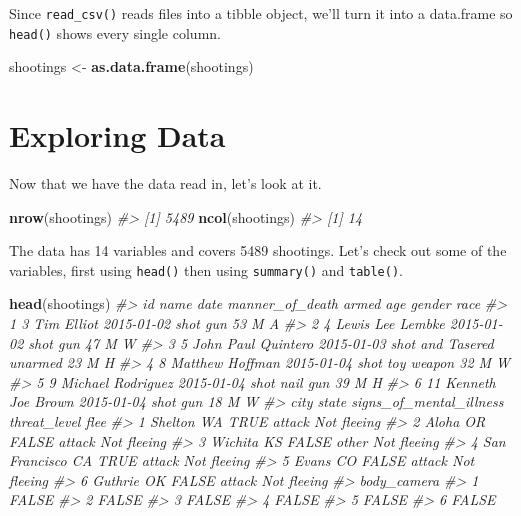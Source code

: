 \documentclass[
  12pt,
]{book}
\newenvironment{Shaded}{\begin{snugshade}}{\end{snugshade}}
\newcommand{\CommentTok}[1]{\textcolor[rgb]{0.37,0.37,0.37}{\textit{#1}}}
\newcommand{\KeywordTok}[1]{\textcolor[rgb]{0.27,0.27,0.27}{\textbf{#1}}}
\newcommand{\NormalTok}[1]{#1}
\newcommand{\StringTok}[1]{\textcolor[rgb]{0.5,0.5,0.5}{#1}}
\begin{document}
Since \texttt{read\_csv()} reads files into a tibble object, we'll turn it into a data.frame so \texttt{head()} shows every single column.

\begin{Shaded}
\begin{Highlighting}[]
\NormalTok{shootings <{-}}\StringTok{ }\KeywordTok{as.data.frame}\NormalTok{(shootings)}
\end{Highlighting}
\end{Shaded}

\hypertarget{exploring-data}{%
\section{Exploring Data}\label{exploring-data}}

Now that we have the data read in, let's look at it.

\begin{Shaded}
\begin{Highlighting}[]
\KeywordTok{nrow}\NormalTok{(shootings)}
\CommentTok{\#> [1] 5489}
\KeywordTok{ncol}\NormalTok{(shootings)}
\CommentTok{\#> [1] 14}
\end{Highlighting}
\end{Shaded}

The data has 14 variables and covers 5489 shootings. Let's check out some of the variables, first using \texttt{head()} then using \texttt{summary()} and \texttt{table()}.

\begin{Shaded}
\begin{Highlighting}[]
\KeywordTok{head}\NormalTok{(shootings)}
\CommentTok{\#>   id               name       date  manner\_of\_death      armed age gender race}
\CommentTok{\#> 1  3         Tim Elliot 2015{-}01{-}02             shot        gun  53      M    A}
\CommentTok{\#> 2  4   Lewis Lee Lembke 2015{-}01{-}02             shot        gun  47      M    W}
\CommentTok{\#> 3  5 John Paul Quintero 2015{-}01{-}03 shot and Tasered    unarmed  23      M    H}
\CommentTok{\#> 4  8    Matthew Hoffman 2015{-}01{-}04             shot toy weapon  32      M    W}
\CommentTok{\#> 5  9  Michael Rodriguez 2015{-}01{-}04             shot   nail gun  39      M    H}
\CommentTok{\#> 6 11  Kenneth Joe Brown 2015{-}01{-}04             shot        gun  18      M    W}
\CommentTok{\#>            city state signs\_of\_mental\_illness threat\_level        flee}
\CommentTok{\#> 1       Shelton    WA                    TRUE       attack Not fleeing}
\CommentTok{\#> 2         Aloha    OR                   FALSE       attack Not fleeing}
\CommentTok{\#> 3       Wichita    KS                   FALSE        other Not fleeing}
\CommentTok{\#> 4 San Francisco    CA                    TRUE       attack Not fleeing}
\CommentTok{\#> 5         Evans    CO                   FALSE       attack Not fleeing}
\CommentTok{\#> 6       Guthrie    OK                   FALSE       attack Not fleeing}
\CommentTok{\#>   body\_camera}
\CommentTok{\#> 1       FALSE}
\CommentTok{\#> 2       FALSE}
\CommentTok{\#> 3       FALSE}
\CommentTok{\#> 4       FALSE}
\CommentTok{\#> 5       FALSE}
\CommentTok{\#> 6       FALSE}
\end{Highlighting}
\end{Shaded}
\end{document}
